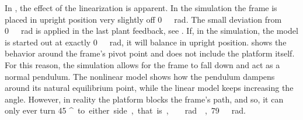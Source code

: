 In , the effect of the linearization is apparent. In the simulation the frame is placed in upright position very slightly off \si{0\ rad}. The small deviation from \si{0\ rad} is applied in the last plant feedback, see . If, in the simulation, the model is started out at exactly \si{0\ rad}, it will balance in upright position.
 shows the behavior around the frame's pivot point and does not include the platform itself. For this reason, the simulation allows for the frame to fall down and act as a normal pendulum. The nonlinear model shows how the pendulum dampens around its natural equilibrium point, while the linear model keeps increasing the angle.
However, in reality the platform blocks the frame's path, and so, it can only ever turn \si{45 ^\circ} to either side, that is, \si{\ rad ,79\ rad}.
%
